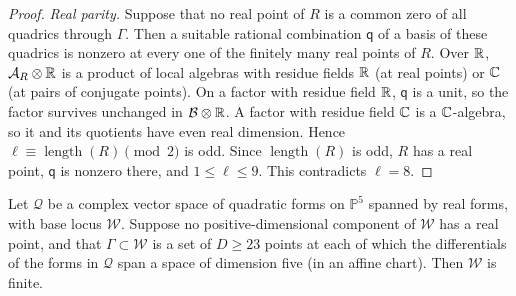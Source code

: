 \begin{proof}
\emph{Real parity.} Suppose that no real point of $R$ is a common zero of all
quadrics through $\Gamma$. Then a suitable rational combination $\mathsf q$ of
a basis of these quadrics is nonzero at every one of the finitely many real
points of $R$. Over $\mathbb R$, $\mathcal A_R\otimes\mathbb R$ is a product of local
algebras with residue fields $\mathbb R$ (at real points) or $\mathbb C$ (at pairs of
conjugate points). On a factor with residue field $\mathbb R$, $\mathsf q$ is a unit,
so the factor survives unchanged in $\mathcal B\otimes\mathbb R$. A factor with
residue field $\mathbb C$ is a $\mathbb C$-algebra, so it and its quotients have even real
dimension. Hence $\ell\equiv\operatorname{length}(R)\pmod2$ is odd. Since
$\operatorname{length}(R)$ is odd, $R$ has a real point, $\mathsf q$ is nonzero
there, and $1\le\ell\le9$. This contradicts $\ell=8$.
\end{proof}

\begin{proposition}
\label{prop:algebraic-positive-base}
Let $\mathcal Q$ be a complex vector space of quadratic forms on
$\mathbb P^5$ spanned by real forms, with base locus $\mathcal W$. Suppose no
positive-dimensional component of $\mathcal W$ has a real point, and that
$\Gamma\subset\mathcal W$ is a set of $D\ge23$ points at each of which the
differentials of the forms in $\mathcal Q$ span a space of dimension five
(in an affine chart). Then $\mathcal W$ is finite.
\end{proposition}

